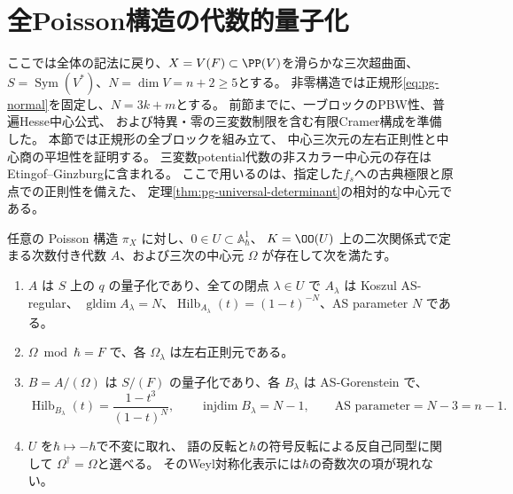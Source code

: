 \section{全Poisson構造の代数的量子化}
\label{sec:pg-quantization}
ここでは全体の記法に戻り、$X=V(F)\subset\PP(V)$を滑らかな三次超曲面、
$S=\operatorname{Sym}(V^*)$、$N=\dim V=n+2\ge5$とする。
非零構造では正規形\eqref{eq:pg-normal}を固定し、$N=3k+m$とする。
前節までに、一ブロックのPBW性、普遍Hesse中心公式、
および特異・零の三変数制限を含む有限Cramer構成を準備した。
本節では正規形の全ブロックを組み立て、
中心三次元の左右正則性と中心商の平坦性を証明する。
三変数potential代数の非スカラー中心元の存在は
Etingof--Ginzburg\cite[Theorem~3.3.2(ii), p.~1385]{EG}に含まれる。
ここで用いるのは、指定した$f_s$への古典極限と原点での正則性を備えた、
定理\ref{thm:pg-universal-determinant}の相対的な中心元である。

\begin{theorem}[代数的量子化]\label{thm:pg-quantization}\label{pthm:quantization}
任意の Poisson 構造 $\pi_X$ に対し、$0\in U\subset\mathbb A^1_\hbar$、
$K=\OO(U)$ 上の二次関係式で定まる次数付き代数 $A$、および三次の中心元 $\Omega$ が存在して次を満たす。
\begin{enumerate}
\item $A$ は $S$ 上の $q$ の量子化であり、全ての閉点 $\lambda\in U$ で
$A_\lambda$ は Koszul AS-regular、
$\operatorname{gldim}A_\lambda=N$、$\operatorname{Hilb}_{A_\lambda}(t)=(1-t)^{-N}$、AS parameter $N$ である。
\item $\Omega\bmod\hbar=F$ で、各 $\Omega_\lambda$ は左右正則元である。
\item $B=A/(\Omega)$ は $S/(F)$ の量子化であり、各 $B_\lambda$ は AS-Gorenstein で、
\begin{equation}
\operatorname{Hilb}_{B_\lambda}(t)=\frac{1-t^3}{(1-t)^N},\qquad
\operatorname{injdim}B_\lambda=N-1,\qquad
\text{AS parameter}=N-3=n-1.
\end{equation}
\item $U$ を$\hbar\mapsto-\hbar$で不変に取れ、
語の反転と$\hbar$の符号反転による反自己同型に関して
$\Omega^\dagger=\Omega$と選べる。
そのWeyl対称化表示には$\hbar$の奇数次の項が現れない。
\end{enumerate}
\end{theorem}

